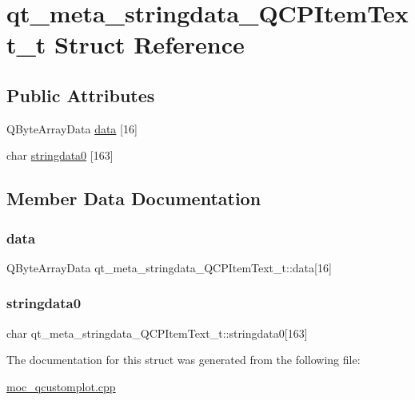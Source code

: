 \hypertarget{structqt__meta__stringdata__QCPItemText__t}{}\section{qt\+\_\+meta\+\_\+stringdata\+\_\+\+Q\+C\+P\+Item\+Text\+\_\+t Struct Reference}
\label{structqt__meta__stringdata__QCPItemText__t}
\subsection*{Public Attributes}
\begin{DoxyCompactItemize}
\item 
Q\+Byte\+Array\+Data \mbox{\hyperlink{structqt__meta__stringdata__QCPItemText__t_a130c44d0975b8c3615445811c48edcab}{data}} \mbox{[}16\mbox{]}
\item 
char \mbox{\hyperlink{structqt__meta__stringdata__QCPItemText__t_ab2e92c59ac0dced63f1fc1f4cc75cbc7}{stringdata0}} \mbox{[}163\mbox{]}
\end{DoxyCompactItemize}


\subsection{Member Data Documentation}
\mbox{\label{structqt__meta__stringdata__QCPItemText__t_a130c44d0975b8c3615445811c48edcab}} 
\subsubsection{\texorpdfstring{data}{data}}
{\footnotesize\ttfamily Q\+Byte\+Array\+Data qt\+\_\+meta\+\_\+stringdata\+\_\+\+Q\+C\+P\+Item\+Text\+\_\+t\+::data\mbox{[}16\mbox{]}}

\mbox{\label{structqt__meta__stringdata__QCPItemText__t_ab2e92c59ac0dced63f1fc1f4cc75cbc7}} 
\subsubsection{\texorpdfstring{stringdata0}{stringdata0}}
{\footnotesize\ttfamily char qt\+\_\+meta\+\_\+stringdata\+\_\+\+Q\+C\+P\+Item\+Text\+\_\+t\+::stringdata0\mbox{[}163\mbox{]}}



The documentation for this struct was generated from the following file\+:\begin{DoxyCompactItemize}
\item 
\mbox{\hyperlink{moc__qcustomplot_8cpp}{moc\+\_\+qcustomplot.\+cpp}}\end{DoxyCompactItemize}
